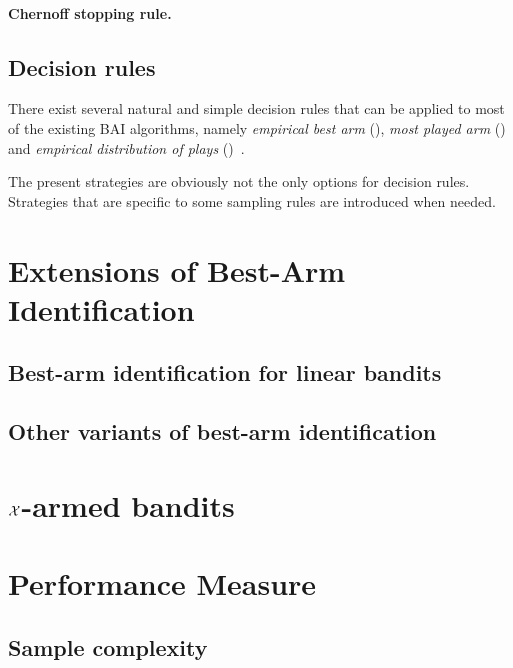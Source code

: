 \paragraph{Chernoff stopping rule.}

\subsection{Decision rules}\label{sec:mab.bai.decision}

There exist several natural and simple decision rules that can be applied to most of the existing BAI algorithms, namely \emph{empirical best arm} (\EBA), \emph{most played arm} (\MPA) and \emph{empirical distribution of plays} (\EDP)~\citep{bubeck2009pure}.

\begin{remark}
\begin{leftbar}[remarkbar]
    The present strategies are obviously not the only options for decision rules. Strategies that are specific to some sampling rules are introduced when needed.
\end{leftbar}
\end{remark}

\section{Extensions of Best-Arm Identification}\label{sec:mab.extensions}

\subsection{Best-arm identification for linear bandits}\label{sec:mab.extensions.linear}

\subsection{Other variants of best-arm identification}\label{sec:mab.extensions.other}

\section{$\mathcal{X}$-armed bandits}\label{sec:mab.continuum}

\section{Performance Measure}\label{sec:mab.performance}

\subsection{Sample complexity}\label{sec:mab.performance.sample}

